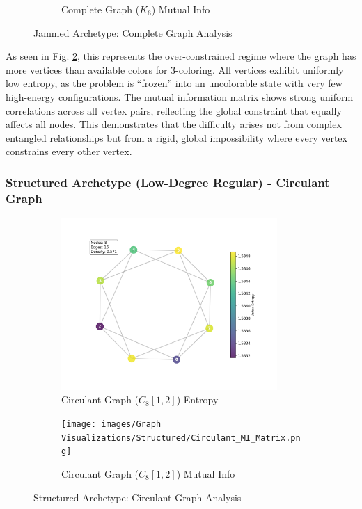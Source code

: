 \documentclass[12pt, letterpaper]{article}
\begin{document}
\begin{figure}[H]
\begin{subfigure}[b]{0.48\textwidth}
        \caption{Complete Graph ($K_6$) Mutual Info}
        \label{fig:complete_mi}
    \end{subfigure}
    \caption{Jammed Archetype: Complete Graph Analysis}
    \label{fig:complete_analysis}
\end{figure}

As seen in Fig. \ref{fig:complete_analysis}, this represents the over-constrained regime where the graph has more vertices than available colors for 3-coloring. All vertices exhibit uniformly low entropy, as the problem is ``frozen'' into an uncolorable state with very few high-energy configurations. The mutual information matrix shows strong uniform correlations across all vertex pairs, reflecting the global constraint that equally affects all nodes. This demonstrates that the difficulty arises not from complex entangled relationships but from a rigid, global impossibility where every vertex constrains every other vertex.

\subsubsection{Structured Archetype (Low-Degree Regular) - Circulant Graph}

\begin{figure}[H]
    \centering
    \begin{subfigure}[b]{0.48\textwidth}
        \includegraphics[width=0.9\textwidth]{images/Graph Visualizations/Structured/Circulant_Vertex_Entropy.png}
        \caption{Circulant Graph ($C_8[1,2]$) Entropy}
        \label{fig:circulant_entropy}
    \end{subfigure}
    \hfill
    \begin{subfigure}[b]{0.48\textwidth}
        \texttt{[image: images/Graph Visualizations/Structured/Circulant\_MI\_Matrix.png]}
        \caption{Circulant Graph ($C_8[1,2]$) Mutual Info}
        \label{fig:circulant_mi}
    \end{subfigure}
    \caption{Structured Archetype: Circulant Graph Analysis}
    \label{fig:circulant_analysis}
\end{figure}
\end{document}
